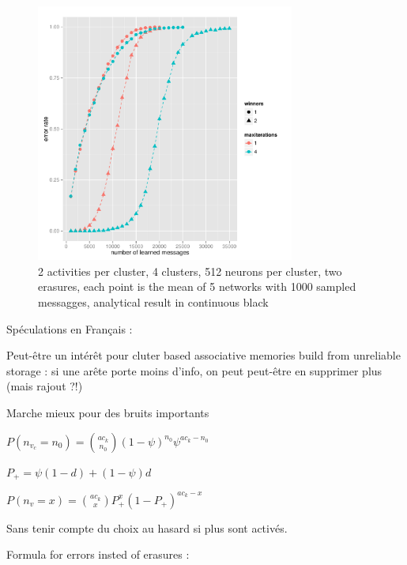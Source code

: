 \documentclass[english,11pt,twocolumn]{article}
\renewcommand{\ge}{\geqslant}
\theoremstyle{definition}
\begin{document}
	\begin{figure}
		\includegraphics[width=8.5cm]{comp_erreurs_a2l512c4er1}
		\caption{2 activities per cluster, 4 clusters, 512 neurons per cluster, two erasures, each point is the mean of 5 networks with 1000 sampled messagges, analytical result in continuous black}
	\end{figure}
		
	\newpage
	Spéculations en Français :
	
	Peut-être un intérêt pour cluter based associative memories build from unreliable storage : si une arête porte moins d'info, on peut peut-être en supprimer plus (mais rajout ?!)
	

	Marche mieux pour des bruits importants
	
	$P(n_{v_c} = n_0) = {a c_k \choose n_0} (1-\psi)^{n_0} \psi ^ { a c_k - n_0 }$
	
	$P_+ = \psi (1 - d) + (1 - \psi) d$
	
	$P(n_v = x) = {a c_k \choose x} P_+^x (1-P_+)^{a c_k -x }$

	
	
	Sans tenir compte du choix au hasard si plus sont activés.
	
	\newpage
	
	Formula for errors insted of erasures : 
	
\end{document}
